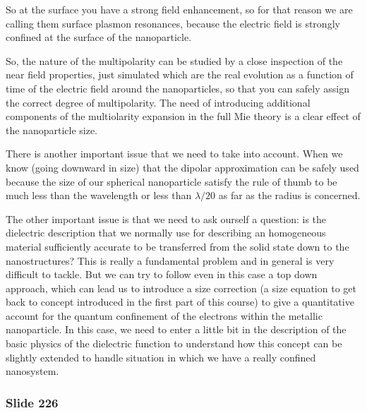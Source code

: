 \documentclass[../main/main.tex]{subfiles}
\begin{document}
\begin{itemize}
So at the surface you have a strong field enhancement, so for that reason we are calling them surface plasmon resonances, because the electric field is strongly confined at the surface of the nanoparticle.


\end{itemize}


So, the nature of the multipolarity can be studied by a close inspection of the near field properties, just simulated which are the real evolution as a function of time of the electric field around the nanoparticles, so that you can safely assign the correct degree of multipolarity.
The need of introducing additional components of the multiolarity expansion in the full Mie theory is a clear effect of the nanoparticle size.

There is another important issue that we need to take into account. When we know (going downward in size) that the dipolar approximation can be safely used because the size of our spherical nanoparticle satisfy the rule of thumb to be much less than the wavelength or less than \( \lambda/20 \) as far as the radius is concerned.

The other important issue is that we need to ask ourself a question: is the dielectric description that we normally use for describing an homogeneous material sufficiently accurate to be transferred from the solid state down to the nanostructures? This is really a fundamental problem and in general is very difficult to tackle. But we can try to follow even in this case a top down approach, which can lead us to introduce a size correction (a size equation to get back to concept introduced in the first part of this course) to give a quantitative account for the quantum confinement of the electrons within the metallic nanoparticle.
In this case, we need to enter  a little bit in the description of the basic physics of the dielectric function to understand how this concept can be slightly extended to handle situation in which we have a really confined nanosystem.

\newpage
\subsubsection{Slide 226}
\end{document}
